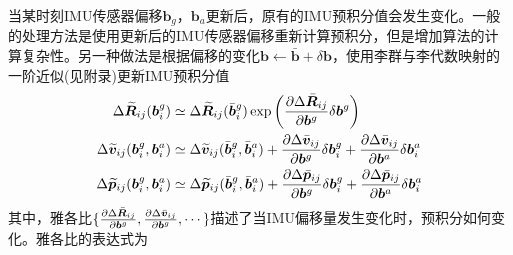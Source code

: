 当某时刻IMU传感器偏移$\boldsymbol{b}_g$，$\boldsymbol{b}_a$更新后，原有的IMU预积分值会发生变化。一般的处理方法是使用更新后的IMU传感器偏移重新计算预积分，但是增加算法的计算复杂性。另一种做法是根据偏移的变化$\boldsymbol{b} \leftarrow \bar{\boldsymbol{b}}+\delta \boldsymbol{b}$，使用李群与李代数映射的一阶近似(见附录)更新IMU预积分值
\begin{equation}
\label{equ5.25}
\begin{aligned}
\Delta \widetilde{\boldsymbol{R}}_{ij}(\boldsymbol{b}_i^g) &\simeq  \Delta \widetilde{\boldsymbol{R}}_{ij}(\bar{\boldsymbol{b}}_i^g) \exp \left( { \partial \Delta \bar{\boldsymbol{R}}_{ij} \over \partial \boldsymbol{b}^g } \delta \boldsymbol{b}^g \right) 
\\
\Delta \widetilde{\boldsymbol{v}}_{ij}(\boldsymbol{b}_i^g,\boldsymbol{b}_i^a) &\simeq \Delta \widetilde{\boldsymbol{v}}_{ij}(\bar{\boldsymbol{b}}_i^g,\bar{\boldsymbol{b}}_i^a) + { \partial \Delta \bar{\boldsymbol{v}}_{ij} \over \partial \boldsymbol{b}^g } \delta \boldsymbol{b}_i^g + { \partial \Delta \bar{\boldsymbol{v}}_{ij} \over \partial \boldsymbol{b}^a } \delta \boldsymbol{b}_i^a 				
\\
\Delta \widetilde{\boldsymbol{p}}_{ij}(\boldsymbol{b}_i^g,\boldsymbol{b}_i^a) &\simeq \Delta \widetilde{\boldsymbol{p}}_{ij}(\bar{\boldsymbol{b}}_i^g,\bar{\boldsymbol{b}}_i^a) + { \partial \Delta \bar{\boldsymbol{p}}_{ij} \over \partial \boldsymbol{b}^g } \delta \boldsymbol{b}_i^g + { \partial \Delta \bar{\boldsymbol{p}}_{ij} \over \partial \boldsymbol{b}^a } \delta \boldsymbol{b}_i^a 	
\end{aligned}
\end{equation}
其中，雅各比$\{ { \partial \Delta \bar{\boldsymbol{R}}_{ij} \over \partial \boldsymbol{b}^g },{ \partial \Delta \bar{\boldsymbol{v}}_{ij} \over \partial \boldsymbol{b}^g }, \cdots \} $描述了当IMU偏移量发生变化时，预积分如何变化。雅各比的表达式为
